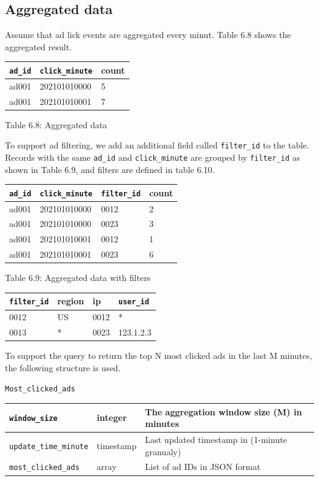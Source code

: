 \documentclass{report}
\theoremstyle{definition}
\let\oldsubsection\subsection
\renewcommand{\subsection}{\oldsubsection*}
\begin{document}
\subsection{Aggregated data}

Assume that ad lick events are aggregated every minut. Table 6.8 shows the aggregated result.

\begin{tabular}{|p{4cm}|p{4cm}|p{4cm}|}
\hline
\lstinline|ad_id| & \lstinline|click_minute| & count \\
\hline
ad001 & 202101010000 & 5 \\
\hline
ad001 & 202101010001 & 7 \\
\hline
\end{tabular}

Table 6.8: Aggregated data

To support ad filtering, we add an additional field called \lstinline|filter_id| to the table. Records with the same \lstinline|ad_id| and \lstinline|click_minute| are grouped by
\lstinline|filter_id| as shown in Table 6.9, and filters are defined in table 6.10.

\begin{tabular}{|p{3.5cm}|p{3.5cm}|p{3.5cm}|p{3.5cm}|}
\hline
\lstinline|ad_id| & \lstinline|click_minute| & \lstinline|filter_id| & count \\
\hline
ad001 & 202101010000 & 0012 & 2 \\
\hline
ad001 & 202101010000 & 0023 & 3 \\
\hline
ad001 & 202101010001 & 0012 & 1 \\
\hline
ad001 & 202101010001 & 0023 & 6 \\
\hline
\end{tabular}
Table 6.9: Aggregated data with filters

\begin{tabular}{|p{3.5cm}|p{3.5cm}|p{3.5cm}|p{3.5cm}|}
\hline
\lstinline|filter_id| & region & ip & \lstinline|user_id| \\
\hline
0012 & US & 0012 & * \\
\hline
0013 & * & 0023 & 123.1.2.3 \\
\hline
\end{tabular}

To support the query to return the top N most clicked ads in the last M minutes, the following structure is used.

\lstinline|Most_clicked_ads|

\begin{tabular}{|p{4cm}|p{4cm}|p{4cm}|}
\hline
\lstinline|window_size| & integer & The aggregation window size (M) in minutes \\
\hline
\lstinline|update_time_minute| & timestamp & Last updated timestamp in (1-minute granualy) \\
\hline
\lstinline|most_clicked_ads| & array & List of ad IDs in JSON format \\
\hline
\end{tabular}
\end{document}
